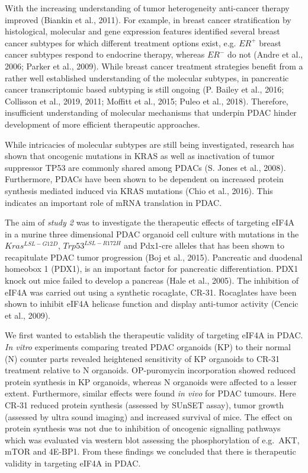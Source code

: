 \documentclass[12pt,openany]{book}
\begin{document}
With the increasing understanding of tumor heterogeneity anti-cancer
therapy improved (Biankin et al., 2011). For example, in breast cancer
stratification by histological, molecular and gene expression features
identified several breast cancer subtypes for which different treatment
options exist, e.g. \(ER^+\) breast cancer subtypes respond to endocrine
therapy, whereas \(ER^-\) do not (Andre et al., 2006; Parker et al.,
2009). While breast cancer treatment strategies benefit from a rather
well established understanding of the molecular subtypes, in pancreatic
cancer transcriptomic based subtyping is still ongoing (P. Bailey et
al., 2016; Collisson et al., 2019, 2011; Moffitt et al., 2015; Puleo et
al., 2018). Therefore, insufficient understanding of molecular
mechanisms that underpin PDAC hinder development of more efficient
therapeutic approaches.

While intricacies of molecular subtypes are still being investigated,
research has shown that oncogenic mutations in KRAS as well as
inactivation of tumor suppressor TP53 are commonly shared among PDACs
(S. Jones et al., 2008). Furthermore, PDACs have been shown to be
dependent on increased protein synthesis mediated induced via KRAS
mutations (Chio et al., 2016). This indicates an important role of mRNA
translation in PDAC.

The aim of \emph{study 2} was to investigate the therapeutic effects of
targeting eIF4A in a murine three dimensional PDAC organoid cell culture
with mutations in the \(Kras^{LSL-G12D}\), \(Trp53^{LSL-R172H}\) and
Pdx1-cre alleles that has been shown to recapitulate PDAC tumor
progression (Boj et al., 2015). Pancreatic and duodenal homeobox 1
(PDX1), is an important factor for pancreatic differentiation. PDX1
knock out mice failed to develop a pancreas (Hale et al., 2005). The
inhibition of eIF4A was carried out using a synthetic rocaglate, CR-31.
Rocaglates have been shown to inhibit eIF4A helicase function and
display anti-tumor activity (Cencic et al., 2009).

We first wanted to establish the therapeutic validity of targeting eIF4A
in PDAC. \emph{In vitro} experiments comparing treated PDAC organoids
(KP) to their normal (N) counter parts revealed heightened sensitivity
of KP organoids to CR-31 treatment relative to N organoids. OP-puromycin
incorporation showed reduced protein synthesis in KP organoids, whereas
N organoids were affected to a lesser extent. Furthermore, similar
effects were found \emph{in vivo} for PDAC tumours. Here CR-31 reduced
protein synthesis (assessed by SUnSET assay), tumor growth (assessed by
ultra sound imaging) and increased survival of mice. The effect on
protein synthesis was not due to inhibition of oncogenic signalling
pathways which was evaluated via western blot assessing the
phosphorylation of e.g.~AKT, mTOR and 4E-BP1. From these findings we
concluded that there is therapeutic validity in targeting eIF4A in PDAC.
\end{document}
